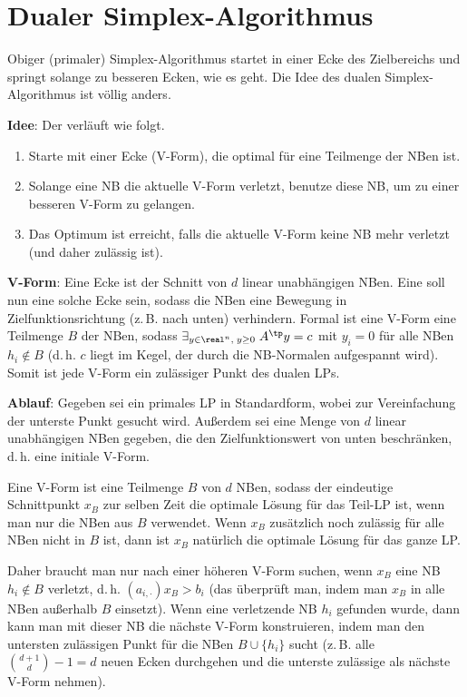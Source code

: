 \pagebreak

\section{%
    Dualer Simplex-Algorithmus%
}

Obiger (primaler) Simplex-Algorithmus startet in einer Ecke des Zielbereichs und springt solange
zu besseren Ecken, wie es geht.
Die Idee des dualen Simplex-Algorithmus ist völlig anders.

\textbf{Idee}:
Der  verläuft wie folgt.
\begin{enumerate}
    \item
    Starte mit einer Ecke (V-Form), die optimal für eine Teilmenge der NBen ist.

    \item
    Solange eine NB die aktuelle V-Form verletzt, benutze diese NB, um zu einer besseren V-Form
    zu gelangen.

    \item
    Das Optimum ist erreicht, falls die aktuelle V-Form keine NB mehr verletzt
    (und daher zulässig ist).
\end{enumerate}

\textbf{V-Form}:
Eine Ecke ist der Schnitt von $d$ linear unabhängigen NBen.
Eine  soll nun eine solche Ecke sein, sodass die NBen eine Bewegung in
Zielfunktionsrichtung (z.\,B. nach unten) verhindern.
Formal ist eine V-Form eine Teilmenge $B$ der NBen,
sodass $\exists_{y \in \real^n,\; y \ge 0}\; A^\tp y = c$
mit $y_i = 0$ für alle NBen $h_i \notin B$
(d.\,h. $c$ liegt im Kegel, der durch die NB-Normalen aufgespannt wird).
Somit ist jede V-Form ein zulässiger Punkt des dualen LPs.

\linie

\textbf{Ablauf}:
Gegeben sei ein primales LP in Standardform, wobei zur Vereinfachung der unterste Punkt gesucht
wird.
Außerdem sei eine Menge von $d$ linear unabhängigen NBen gegeben, die den Zielfunktionswert von
unten beschränken, d.\,h. eine initiale V-Form.

Eine V-Form ist eine Teilmenge $B$ von $d$ NBen, sodass der eindeutige Schnittpunkt $x_B$ zur
selben Zeit die optimale Lösung für das Teil-LP ist, wenn man nur die NBen aus $B$ verwendet.
Wenn $x_B$ zusätzlich noch zulässig für alle NBen nicht in $B$ ist, dann ist $x_B$ natürlich die
optimale Lösung für das ganze LP.

Daher braucht man nur nach einer höheren V-Form suchen, wenn $x_B$ eine NB $h_i \notin B$
verletzt, d.\,h. $(a_{i,\cdot}) x_B > b_i$
(das überprüft man, indem man $x_B$ in alle NBen außerhalb $B$ einsetzt).
Wenn eine verletzende NB $h_i$ gefunden wurde, dann kann man mit dieser NB die nächste V-Form
konstruieren, indem man den untersten zulässigen Punkt für die NBen $B \cup \{h_i\}$ sucht
(z.\,B. alle $\binom{d+1}{d} - 1 = d$ neuen Ecken durchgehen und
die unterste zulässige als nächste V-Form nehmen).

